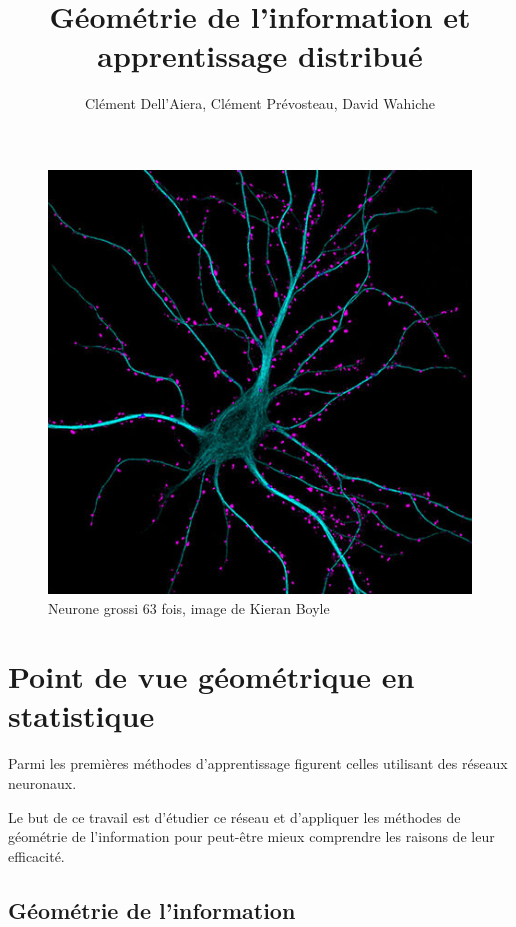 \documentclass{article}
\title{Géométrie de l'information et apprentissage distribué}
\author{Clément Dell'Aiera, Clément Prévosteau, David Wahiche}
\date{}
\begin{document}
\maketitle

\begin{figure}[h]\centering
\includegraphics[scale=0.6]{Neurone.jpg}
\caption{Neurone grossi 63 fois, image de Kieran Boyle}
\label{fig:Neurone}
\end{figure}

\newpage
\tableofcontents

\newpage
\section{Point de vue géométrique en statistique}

Parmi les premières méthodes d'apprentissage figurent celles utilisant des réseaux neuronaux. %

Le but de ce travail est d'étudier ce réseau et d'appliquer les méthodes de géométrie de l'information pour peut-être mieux comprendre les raisons de leur efficacité.%

\subsection{Géométrie de l'information}
\end{document}
